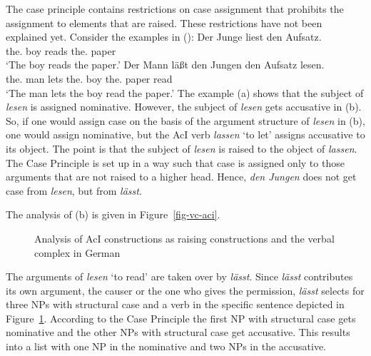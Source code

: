 The case principle contains restrictions on case assignment that prohibits the assignment to
elements that are raised. These restrictions have not been explained yet. Consider the examples in ():
\eal
\ex
\gll Der Junge liest den Aufsatz.\\
     the.\NOM{} boy reads the.\ACC{} paper\\
\glt `The boy reads the paper.'
\ex\label{ex-the-man-lets-the-boy-read-the-book}
\gll Der Mann läßt den Jungen den Aufsatz lesen.\\
     the.\NOM{} man lets the.\ACC{} boy the.\ACC{} paper read\\
\glt `The man lets the boy read the paper.'
\zl
The example (a) shows that the subject of \emph{lesen} is
assigned nominative. However, the subject of \emph{lesen} gets accusative in (b). So, if
one would assign case on the basis of the argument structure of \emph{lesen} in (b), one
would assign nominative, but the AcI verb \emph{lassen} `to let' assigns accusative to its object. The
point is that the subject of \emph{lesen} is raised to the object of \emph{lassen}. The Case
Principle is set up in a way such that case is assigned only to those arguments that are not raised
to a higher head. Hence, \emph{den Jungen} does not get case from \emph{lesen}, but from \emph{lässt}.

The analysis of (b) is given in Figure~\vref{fig-vc-aci}.
\begin{figure}
\caption{\label{fig-vc-aci}Analysis of AcI constructions as raising constructions and the verbal
  complex in German}
\end{figure}
The arguments of \emph{lesen} `to read' are taken over by \emph{lässt}. Since \emph{lässt}
contributes its own argument, the causer or the one who gives the permission, \emph{lässt} selects
for three NPs with structural case and a verb in the specific sentence depicted in
Figure~\ref{fig-vc-aci}. According to the Case Principle the first NP with structural case gets
nominative and the other NPs with structural case get accusative. This results into a list with one
NP in the nominative and two NPs in the accusative.

